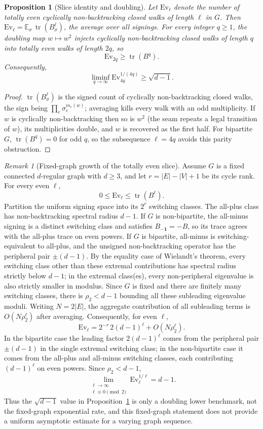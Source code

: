 \documentclass[11pt]{article}
\newtheorem{proposition}[lemma]{Proposition}
\theoremstyle{remark}
\newtheorem{remark}[lemma]{Remark}
\DeclareMathOperator{\tr}{tr}
\begin{document}
\begin{proposition}[Slice identity and doubling]\label{prop:slice}
Let $\mathrm{Ev}_\ell$ denote the number of totally even cyclically
non-backtracking closed walks of length $\ell$ in $G$. Then
$\mathrm{Ev}_\ell=\mathbb E_{\sigma}\,\tr(B_\sigma^{\ell})$, the average
over all signings. For every integer $q\ge1$, the doubling map
$w\mapsto w^2$ injects cyclically non-backtracking closed walks of length
$q$ into totally even walks of length $2q$, so
\[
\mathrm{Ev}_{2q}\ge\tr(B^q).
\]
Consequently,
\[
\liminf_{q\to\infty}\mathrm{Ev}_{4q}^{1/(4q)}\ge\sqrt{d-1}.
\]
\end{proposition}

\begin{proof}
$\tr(B_\sigma^\ell)$ is the signed count of cyclically non-backtracking
closed walks, the sign being $\prod_e\sigma_e^{m_e(w)}$; averaging kills every
walk with an odd multiplicity. If $w$ is cyclically non-backtracking
then so is $w^2$ (the seam repeats a legal transition of $w$), its
multiplicities double, and $w$ is recovered as the first half. For
bipartite $G$, $\tr(B^q)=0$ for odd $q$, so the subsequence $\ell=4q$
avoids this parity obstruction.
\end{proof}

\begin{remark}[Fixed-graph growth of the totally even slice]
Assume $G$ is a fixed connected $d$-regular graph with $d\ge3$, and let
$r=|E|-|V|+1$ be its cycle rank. For every even $\ell$,
\[
0\le \mathrm{Ev}_\ell\le \operatorname{tr}(B^\ell).
\]
Partition the uniform signing space into its $2^r$ switching classes. The all-plus class
has non-backtracking spectral radius $d-1$. If $G$ is non-bipartite, the all-minus signing
is a distinct switching class and satisfies $B_{-\mathbf 1}=-B$, so its trace agrees with the
all-plus trace on even powers. If $G$ is bipartite, all-minus is switching-equivalent to
all-plus, and the unsigned non-backtracking operator has the peripheral pair
$\pm(d-1)$. By the equality case of Wielandt's theorem, every switching class other than
these extremal contributions has spectral radius strictly below $d-1$; in the extremal
class(es), every non-peripheral eigenvalue is also strictly smaller in modulus. Since $G$
is fixed and there are finitely many switching classes, there is $\rho_2<d-1$ bounding all
these subleading eigenvalue moduli. Writing $N=2|E|$, the aggregate contribution of all
subleading terms is $O(N\rho_2^\ell)$ after averaging. Consequently, for even $\ell$,
\[
\mathrm{Ev}_\ell=2^{-r}\,2(d-1)^\ell+O(N\rho_2^\ell).
\]
In the bipartite case the leading factor $2(d-1)^\ell$ comes from the peripheral pair
$\pm(d-1)$ in the single extremal switching class; in the non-bipartite case it comes from
the all-plus and all-minus switching classes, each contributing $(d-1)^\ell$ on even powers.
Since $\rho_2<d-1$,
\[
\lim_{\substack{\ell\to\infty\\ \ell\equiv0\pmod2}}
\mathrm{Ev}_\ell^{1/\ell}=d-1.
\]
Thus the $\sqrt{d-1}$ value in Proposition~\ref{prop:slice} is only a doubling lower
benchmark, not the fixed-graph exponential rate, and this fixed-graph statement does not
provide a uniform asymptotic estimate for a varying graph sequence.
\end{remark}
\end{document}
